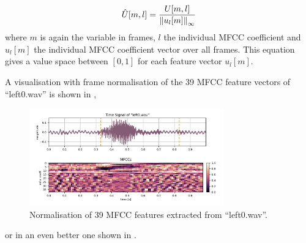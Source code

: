 \begin{equation}\label{eq:signal_mfcc_norm}
  \hat{U}[m, l] = \frac{U[m, l]}{\norm{u_l[m]}_\infty}
\end{equation}
where $m$ is again the variable in frames, $l$ the individual MFCC coefficient and $u_l[m]$ the individual MFCC coefficient vector over all frames.
This equation gives a value space between $[0, 1]$ for each feature vector $u_l[m]$.

A visualisation with frame normalisation of the 39 MFCC feature vectors of \enquote{left0.wav} is shown in ,

\begin{figure}[!ht]
  \centering
    \includegraphics[width=0.75\textwidth]{./3_signal/figs/signal_mfcc_left0_no_order_norm1.png}
  \caption{Normalisation of 39 MFCC features extracted from \enquote{left0.wav}.}
  \label{fig:left0_no_order_norm1}
\end{figure}
\FloatBarrier
\noindent
or in an even better one shown in .

